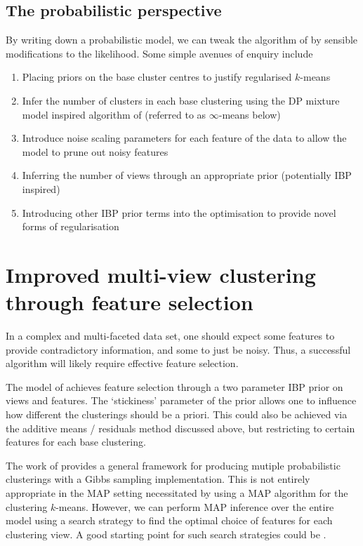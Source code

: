 \documentclass{article}
\numberwithin{equation}{section}
\numberwithin{thm}{section}
\begin{document}
\subsection{The probabilistic perspective}

By writing down a probabilistic model, we can tweak the algorithm of \cite{Cui2007} by sensible modifications to the likelihood.
Some simple avenues of enquiry include
\begin{enumerate}
\item Placing priors on the base cluster centres to justify regularised $k$-means \citep[e.g.][]{Sun2012}
\item Infer the number of clusters in each base clustering using the DP mixture model inspired algorithm of \cite{Kulis2012} (referred to as $\infty$-means below)
\item Introduce noise scaling parameters for each feature of the data to allow the model to prune out noisy features
\item Inferring the number of views through an appropriate prior (potentially IBP inspired)
\item Introducing other IBP prior terms into the optimisation to provide novel forms of regularisation
\end{enumerate}

\section{Improved multi-view clustering through feature selection}

In a complex and multi-faceted data set, one should expect some features to provide contradictory information, and some to just be noisy.
Thus, a successful algorithm will likely require effective feature selection.

The model of \citep{Niu2012} achieves feature selection through a two parameter IBP prior on views and features.
The `stickiness' parameter of the prior allows one to influence how different the clusterings should be a priori.
This could also be achieved via the additive means / residuals method discussed above, but restricting to certain features for each base clustering.

The work of \citep{Niu2012} provides a general framework for producing mutiple probabilistic clusterings with a Gibbs sampling implementation.
This is not entirely appropriate in the MAP setting necessitated by using a MAP algorithm for the clustering \ie $k$-means.
However, we can perform MAP inference over the entire model using a search strategy to find the optimal choice of features for each clustering view.
A good starting point for such search strategies could be \cite{Dy2004}.
\end{document}
